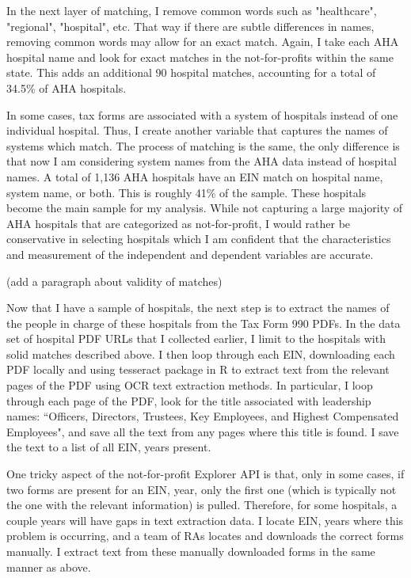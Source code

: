 \documentclass[12pt]{article}
\begin{document}
In the next layer of matching, I remove common words such as "healthcare", "regional", "hospital", etc. That way if there are subtle differences in names, removing common words may allow for an exact match. Again, I take each AHA hospital name and look for exact matches in the not-for-profits within the same state. This adds an additional 90 hospital matches, accounting for a total of 34.5\% of AHA hospitals. 

In some cases, tax forms are associated with a system of hospitals instead of one individual hospital. Thus, I create another variable that captures the names of systems which match. The process of matching is the same, the only difference is that now I am considering system names from the AHA data instead of hospital names. A total of 1,136 AHA hospitals have an EIN match on hospital name, system name, or both. This is roughly 41\% of the sample. These hospitals become the main sample for my analysis. While not capturing a large majority of AHA hospitals that are categorized as not-for-profit, I would rather be conservative in selecting hospitals which I am confident that the characteristics and measurement of the independent and dependent variables are accurate. 

(add a paragraph about validity of matches)

 Now that I have a sample of hospitals, the next step is to extract the names of the people in charge of these hospitals from the Tax Form 990 PDFs. In the data set of hospital PDF URLs that I collected earlier, I limit to the hospitals with solid matches described above. I then loop through each EIN, downloading each PDF locally and using tesseract package in R to extract text from the relevant pages of the PDF using OCR text extraction methods. In particular, I loop through each page of the PDF, look for the title associated with leadership names: ``Officers, Directors, Trustees, Key Employees, and Highest Compensated Employees", and save all the text from any pages where this title is found. I save the text to a list of all EIN, years present. 

One tricky aspect of the not-for-profit Explorer API is that, only in some cases, if two forms are present for an EIN, year, only the first one (which is typically not the one with the relevant information) is pulled. Therefore, for some hospitals, a couple years will have gaps in text extraction data. I locate EIN, years where this problem is occurring, and a team of RAs locates and downloads the correct forms manually. I extract text from these manually downloaded forms in the same manner as above. 
\end{document}
